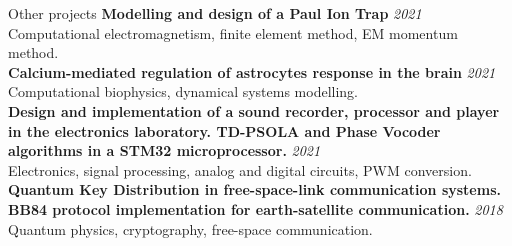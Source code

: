 \documentclass{resume} %
\begin{document}
\begin{rSection}{Other projects}
{\bf Modelling and design of a Paul Ion Trap} \hfill {\em 2021} 
\\ Computational electromagnetism, finite element method, EM momentum method.\\

{\bf Calcium-mediated regulation of astrocytes response in the brain} \hfill {\em 2021} 
\\ Computational biophysics, dynamical systems modelling. \\

{\bf Design and implementation of a sound recorder, processor and player in the electronics laboratory.
TD-PSOLA and Phase Vocoder algorithms in a STM32 
 microprocessor.} \hfill {\em 2021} 
\\ Electronics, signal processing, analog and digital circuits, PWM conversion. \\

{\bf Quantum Key Distribution in free-space-link communication systems. BB84 protocol implementation for earth-satellite communication.} \hfill {\em 2018} 
\\ Quantum physics, cryptography, free-space communication. \\
\end{rSection}
\end{document}
